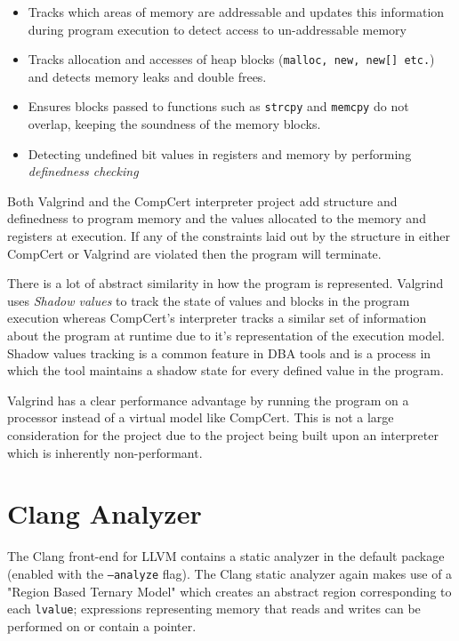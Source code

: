\begin{itemize}
    \item Tracks which areas of memory are addressable and updates this information during program execution to detect access to un-addressable memory
    
    \item Tracks allocation and accesses of heap blocks (\texttt{malloc, new, new[] etc.}) and detects memory leaks and double frees.
    
    \item Ensures blocks passed to functions such as \texttt{strcpy} and \texttt{memcpy} do not overlap, keeping the soundness of the memory blocks. 
    
    \item Detecting undefined bit values in registers and memory by performing \textit{definedness checking}
\end{itemize}

Both Valgrind and the CompCert interpreter project add structure and definedness to program memory and the values allocated to the memory and registers at execution. If any of the constraints laid out by the structure in either CompCert or Valgrind are violated then the program will terminate.

There is a lot of abstract similarity in how the program is represented. Valgrind uses \textit{Shadow values} to track the state of values and blocks in the program execution whereas CompCert's interpreter tracks a similar set of information about the program at runtime due to it's representation of the execution model. Shadow values tracking is a common feature in DBA tools and is a process in which the tool maintains a shadow state for every defined value in the program. 

Valgrind has a clear performance advantage by running the program on a processor instead of a virtual model like CompCert. This is not a large consideration for the project due to the project being built upon an interpreter which is inherently non-performant.

\section{Clang Analyzer}
The Clang front-end for LLVM\cite{lattner2008llvm} contains a static analyzer in the default package (enabled with the  \texttt{--analyze} flag). The Clang static analyzer again makes use of a "Region Based Ternary Model" which creates an abstract region corresponding to each \texttt{lvalue}; expressions representing memory that reads and writes can be performed on or contain a pointer.

